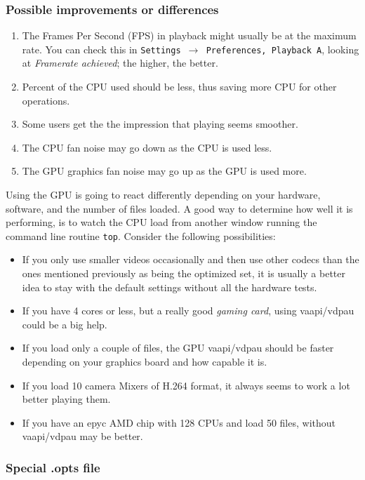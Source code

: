 \subsubsection*{Possible improvements or differences}%
\label{ssub:possible_improvements_differences}

\begin{enumerate}
	\item The Frames Per Second (FPS) in playback might usually be at the maximum rate.  You can check
	this in \texttt{Settings $\rightarrow$ Preferences, Playback A}, looking at \textit{Framerate achieved}; the higher, the better.
	\item Percent of the CPU used should be less, thus saving more CPU for other operations.
	\item Some users get the the impression that playing seems smoother.
	\item The CPU fan noise may go down as the CPU is used less.
	\item The GPU graphics fan noise may go up as the GPU is used more.
\end{enumerate}

Using the GPU is going to react differently depending on your hardware, software, and the number of files loaded. A good way to determine how well it is performing, is to watch the CPU load from another window running the command line routine \texttt{top}. Consider the following possibilities:

\begin{itemize}
	\item If you only use smaller videos occasionally and then use other codecs than the ones mentioned
	previously as being the optimized set, it is usually a better idea to stay with the default settings
	without all the hardware tests.
	\item If you have 4 cores or less, but a really good \textit{gaming card}, using vaapi/vdpau could be a big help.
	\item If you load only a couple of files, the GPU vaapi/vdpau should be faster depending on your graphics
	board and how capable it is.
	\item If you load 10 camera Mixers of H.264 format, it always seems to work a lot better playing them.
	\item If you have an epyc AMD chip with 128 CPUs and load 50 files, without vaapi/vdpau may be better.
\end{itemize}

\subsubsection*{Special .opts file}%
\label{ssub:special_opts_file}

